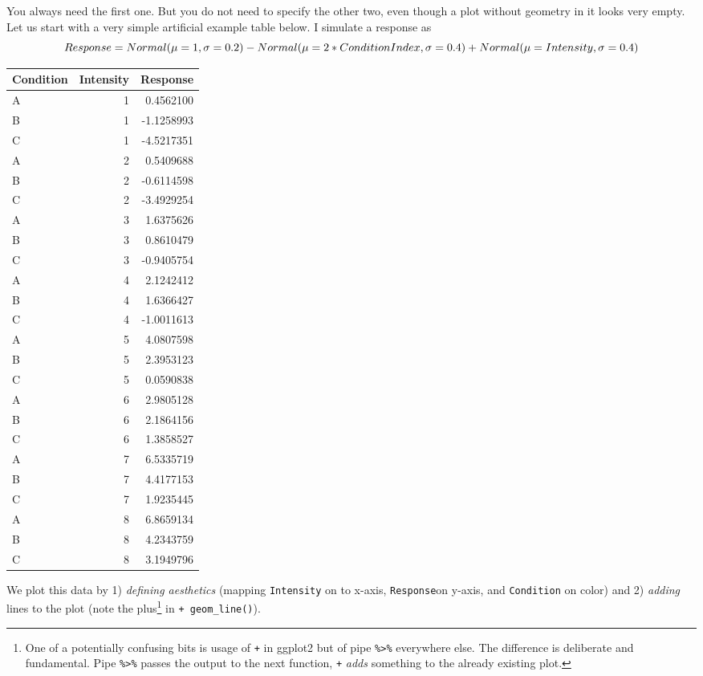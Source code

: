 \documentclass[
]{book}
\begin{document}
You always need the first one. But you do not need to specify the other two, even though a plot without geometry in it looks very empty. Let us start with a very simple artificial example table below. I simulate a response as
\[Response = Normal(\mu=1, \sigma=0.2) - \\
Normal(\mu=2*ConditionIndex, \sigma=0.4) + \\ Normal(\mu=Intensity, \sigma=0.4)\]

\begin{tabular}{l|r|r}
\hline
Condition & Intensity & Response\\
\hline
A & 1 & 0.4562100\\
\hline
B & 1 & -1.1258993\\
\hline
C & 1 & -4.5217351\\
\hline
A & 2 & 0.5409688\\
\hline
B & 2 & -0.6114598\\
\hline
C & 2 & -3.4929254\\
\hline
A & 3 & 1.6375626\\
\hline
B & 3 & 0.8610479\\
\hline
C & 3 & -0.9405754\\
\hline
A & 4 & 2.1242412\\
\hline
B & 4 & 1.6366427\\
\hline
C & 4 & -1.0011613\\
\hline
A & 5 & 4.0807598\\
\hline
B & 5 & 2.3953123\\
\hline
C & 5 & 0.0590838\\
\hline
A & 6 & 2.9805128\\
\hline
B & 6 & 2.1864156\\
\hline
C & 6 & 1.3858527\\
\hline
A & 7 & 6.5335719\\
\hline
B & 7 & 4.4177153\\
\hline
C & 7 & 1.9235445\\
\hline
A & 8 & 6.8659134\\
\hline
B & 8 & 4.2343759\\
\hline
C & 8 & 3.1949796\\
\hline
\end{tabular}

We plot this data by 1) \emph{defining aesthetics} (mapping \texttt{Intensity} on to x-axis, \texttt{Response}on y-axis, and \texttt{Condition} on color) and 2) \emph{adding} lines to the plot (note the plus\footnote{One of a potentially confusing bits is usage of \texttt{+} in ggplot2 but of pipe \texttt{\%\textgreater{}\%} everywhere else. The difference is deliberate and fundamental. Pipe \texttt{\%\textgreater{}\%} passes the output to the next function, \texttt{+} \emph{adds} something to the already existing plot.} in \texttt{+\ geom\_line()}).
\end{document}
